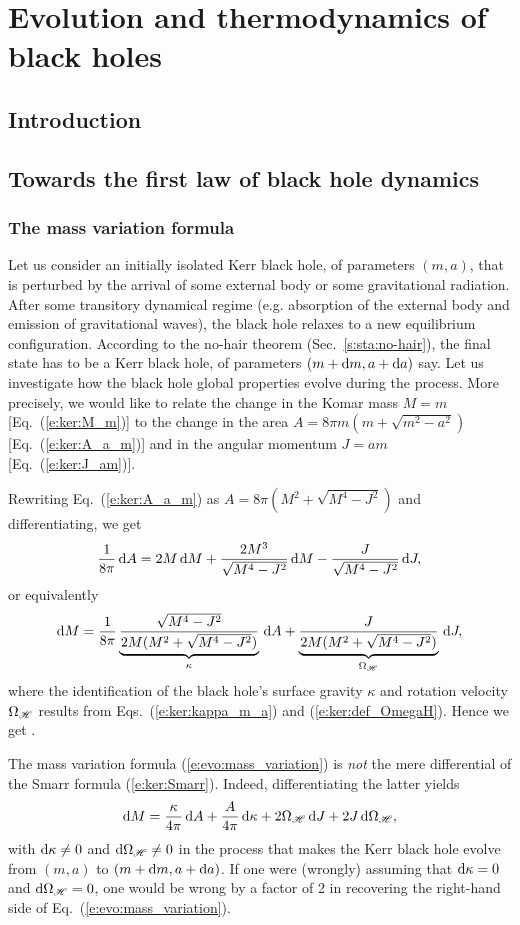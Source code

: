 \chapter{Evolution and thermodynamics of black holes}
\label{s:evo}

\minitoc

\section{Introduction}

\section{Towards the first law of black hole dynamics}

\subsection{The mass variation formula}

Let us consider an initially isolated Kerr black hole, of parameters $(m,a)$,
that is perturbed by the arrival of some external body or some gravitational
radiation. After some transitory dynamical regime (e.g. absorption of the
external body and emission of gravitational waves), the black hole relaxes
to a new equilibrium configuration. According to the
no-hair theorem (Sec.~\ref{s:sta:no-hair}),
the final state has to be a Kerr black hole, of
parameters $(m+\mathrm{d} m, a+\mathrm{d} a)$ say.
Let us investigate how the black hole global properties evolve during the
process. More precisely, we would like to relate the change
in the Komar mass $M = m$ [Eq.~(\ref{e:ker:M_m})] to the change in
the area $A = 8 \pi m (m + \sqrt{m^2-a^2})$ [Eq.~(\ref{e:ker:A_a_m})]
and in the angular momentum $J = a m$ [Eq.~(\ref{e:ker:J_am})].

Rewriting Eq.~(\ref{e:ker:A_a_m}) as $A = 8 \pi (M^2 + \sqrt{M^4 - J^2})$
and differentiating, we get
\[
\frac{1}{8\pi} \, \mathrm{d} A =  2 M\,  \mathrm{d} M + \frac{2M^3}{\sqrt{M^4-J^2}}\, \mathrm{d} M
    - \frac{J}{\sqrt{M^4-J^2}}\, \mathrm{d} J ,
\]
or equivalently
\[
    \mathrm{d} M = \frac{1}{8\pi}
\underbrace{\frac{\sqrt{M^4-J^2}}{2M(M^2+\sqrt{M^4-J^2})}}_{\kappa} \, \mathrm{d} A
+ \underbrace{\frac{J}{2M(M^2+\sqrt{M^4-J^2})}}_{\Omega_{\mathscr{H}}} \, \mathrm{d} J  ,
\]
where the identification of the black hole's surface gravity $\kappa$ and
rotation velocity $\Omega_{\mathscr{H}}$ results from Eqs.~(\ref{e:ker:kappa_m_a})
and (\ref{e:ker:def_OmegaH}). Hence we get
\be \label{e:evo:mass_variation}
     .
\ee
\begin{remark}
The mass variation formula (\ref{e:evo:mass_variation}) is \emph{not}
the mere differential of the Smarr formula (\ref{e:ker:Smarr}). Indeed, differentiating
the latter yields
\[
    \mathrm{d} M = \frac{\kappa}{4\pi} \, \mathrm{d} A +  \frac{A}{4\pi} \, \mathrm{d} \kappa
        + 2 \Omega_{\mathscr{H}} \, \mathrm{d} J  + 2 J \, \mathrm{d}\Omega_{\mathscr{H}} ,
\]
with $\mathrm{d}\kappa \neq 0$ and $\mathrm{d}\Omega_{\mathscr{H}}\neq 0$ in the process
that makes the Kerr black hole evolve from $(m,a)$ to $(m+\mathrm{d} m, a+\mathrm{d} a)$.
If one were (wrongly) assuming that $\mathrm{d}\kappa = 0$ and $\mathrm{d}\Omega_{\mathscr{H}} = 0$, one would
be wrong by a factor of 2 in recovering the right-hand side of
Eq.~(\ref{e:evo:mass_variation}).
\end{remark}
